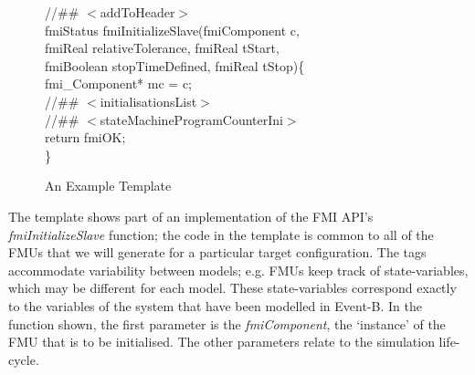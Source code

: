 \documentclass{llncs}%
\begin{document}
\begin{figure}
\begin{center}
\begin{minipage}{0.6\textwidth}
//\#\# $<$addToHeader$>$\\
fmiStatus fmiInitializeSlave(fmiComponent c,\\
\hspace*{0.2cm}fmiReal relativeTolerance, fmiReal tStart,\\
\hspace*{0.2cm}fmiBoolean stopTimeDefined, fmiReal tStop)\{\\
\hspace*{0.4cm}fmi\_Component* mc = c;\\
\hspace*{0.4cm}//\#\# $<$initialisationsList$>$\\
\hspace*{0.4cm}//\#\# $<$stateMachineProgramCounterIni$>$\\
\hspace*{0.4cm}return fmiOK;\\
\}
\caption{An Example Template}
\label{fig:templateExample}
\end{minipage}
\end{center}
\end{figure}
%
%
The template shows part of an implementation of the FMI API's \emph{fmiInitializeSlave} function; the code in the template is common to all of the FMUs that we will generate for a particular target configuration. The tags accommodate variability between models; e.g. FMUs keep track of state-variables, which may be different for each model. These state-variables correspond exactly to the variables of the system that have been modelled in Event-B. In the function shown, the first parameter is the \emph{fmiComponent}, the `instance' of the FMU that is to be initialised. The other parameters relate to the simulation life-cycle.  
\end{document}

